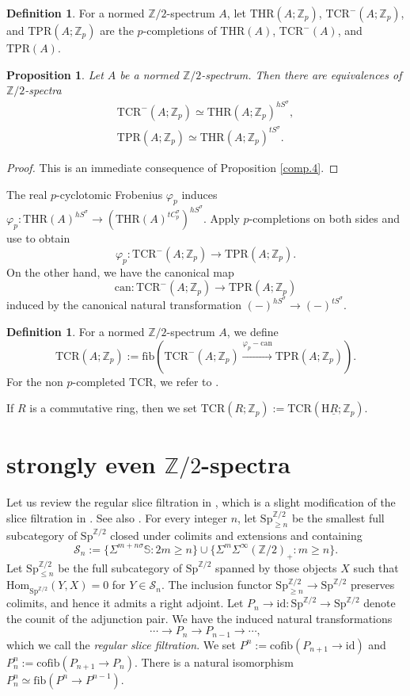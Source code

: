 \documentclass[10pt]{amsart}
\newtheorem{prop}[thm]{Proposition}
\theoremstyle{definition}
\newtheorem{df}[thm]{Definition}
\numberwithin{equation}{section}
\newcommand{\Sphere}{\mathbb{S}}
\newcommand{\Z}{\mathbb{Z}}
\newcommand{\cS}{\mathcal{S}}
\newcommand{\rH}{\mathrm{H}}
\newcommand{\ul}{\underline}
\newcommand{\Sp}{\mathrm{Sp}}
\newcommand{\Hom}{\mathrm{Hom}}
\newcommand{\fib}{\mathrm{fib}}
\newcommand{\cofib}{\mathrm{cofib}}
\newcommand{\id}{\mathrm{id}}
\newcommand{\can}{\mathrm{can}}
\newcommand{\TPR}{\mathrm{TPR}}
\newcommand{\THR}{\mathrm{THR}}
\newcommand{\TCR}{\mathrm{TCR}}
\begin{document}
{\begin{df}
\label{comp.5}
For a normed $\Z/2$-spectrum $A$, let $\THR(A;\Z_p)$, $\TCR^-(A;\Z_p)$, and $\TPR(A;\Z_p)$ are the $p$-completions of $\THR(A)$, $\TCR^-(A)$, and $\TPR(A)$.
\end{df}


\begin{prop}
\label{comp.6}
Let $A$ be a normed $\Z/2$-spectrum.
Then there are equivalences of $\Z/2$-spectra
\begin{gather*}
\TCR^-(A;\Z_p)
\simeq
\THR(A;\Z_p)^{hS^\sigma},
\\
\TPR(A;\Z_p)
\simeq
\THR(A;\Z_p)^{tS^\sigma}.
\end{gather*}
\end{prop}
\begin{proof}
This is an immediate consequence of Proposition \ref{comp.4}.
\end{proof}

The real $p$-cyclotomic Frobenius $\varphi_p$ induces
\(
\varphi_p\colon \THR(A)^{hS^\sigma} \to (\THR(A)^{tC_p^\sigma})^{hS^\sigma}.
\)
Apply $p$-completions on both sides and use \cite[Proposition 4.4]{QS22} to obtain
\[
\varphi_p\colon \TCR^-(A;\Z_p)
\to
\TPR(A;\Z_p).
\]
On the other hand,
we have the canonical map
\[
\can \colon \TCR^-(A;\Z_p)
\to
\TPR(A;\Z_p)
\]
induced by the canonical natural transformation $(-)^{h S^\sigma}\to (-)^{tS^\sigma}$.

\begin{df}
\label{comp.8}
For a normed $\Z/2$-spectrum $A$,
we define
\[
\TCR(A;\Z_p)
:=
\fib(\TCR^-(A;\Z_p)\xrightarrow{\varphi_p-\can}\TPR(A;\Z_p)).
\]
For the non $p$-completed $\TCR$, we refer to \cite[Remark 4.3]{QS22}.

If $R$ is a commutative ring, then we set $\TCR(R;\Z_p):=\TCR(\rH \ul{R};\Z_p)$.
\end{df}


\section{strongly even \texorpdfstring{$\Z/2$}{Z/2}-spectra}



Let us review the regular slice filtration in \cite{Ull13},
which is a slight modification of the slice filtration in \cite{HHR}.
See also \cite[\S 11.1]{HHR21}.
For every integer $n$,
let $\Sp_{\geq n}^{\Z/2}$ be the smallest full subcategory of $\Sp^{\Z/2}$ closed under colimits and extensions and containing
\[
\cS_n
:=
\{
\Sigma^{m+n\sigma} \Sphere:2m\geq n
\}
\cup
\{\Sigma^m \Sigma^\infty (\Z/2)_+ : m\geq n\}.
\]
Let $\Sp_{\leq n}^{\Z/2}$ be the full subcategory of $\Sp^{\Z/2}$ spanned by those objects $X$ such that $\Hom_{\Sp^{\Z/2}}(Y,X)=0$ for $Y\in \cS_n$.
The inclusion functor $\Sp_{\geq n}^{\Z/2}\to \Sp^{\Z/2}$ preserves colimits, and hence it admits a right adjoint.
Let $P_n\to \id\colon \Sp^{\Z/2}\to \Sp^{\Z/2}$ denote the counit of the adjunction pair.
We have the induced natural transformations
\[
\cdots \to P_n\to P_{n-1}\to \cdots,
\]
which we call the \emph{regular slice filtration}.
We set $P^n:=\cofib(P_{n+1}\to \id)$ and $P_n^n:=\cofib(P_{n+1}\to P_n)$.
There is a natural isomorphism $P_n^n\simeq \fib(P^n\to P^{n-1})$.


}
\end{document}

